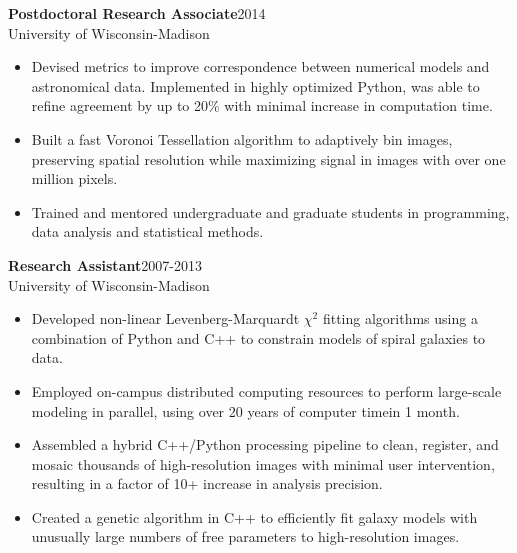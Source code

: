 \documentclass[11pt]{res}
\begin{document}
\begin{resume}
\pagebreak
{\bf Postdoctoral Research Associate}\hfill\mbox{2014}\\
University of Wisconsin-Madison
                  \vspace* {0.01 in}\begin{itemize} \itemsep -2pt
                    \item Devised metrics to improve correspondence between numerical models and
                      astronomical data. Implemented in highly
                      optimized Python, was able to refine agreement by
                      up to 20\% with minimal increase in computation time.
                    \item Built a fast Voronoi Tessellation algorithm
                      to adaptively bin images, preserving spatial
                      resolution while maximizing signal in images
                      with over one million pixels.
                    \item Trained and mentored undergraduate and
                      graduate students in programming, data analysis and statistical methods.
                    \end{itemize}

{\bf Research Assistant}\hfill\mbox{2007-2013}\\
University of Wisconsin-Madison
                  \vspace* {0.01 in}\begin{itemize} \itemsep -2pt
                    \item Developed non-linear Levenberg-Marquardt
                      $\chi^{2}$ fitting algorithms using a
                      combination of Python and C++ to constrain
                      models of spiral galaxies to data. 
                   \item Employed on-campus distributed computing
                     resources to perform large-scale modeling in parallel, using over 20 years of 
                     computer timein 1 month.
                   \item Assembled a hybrid C++/Python processing
                     pipeline to clean, register, and
                     mosaic thousands of high-resolution images with
                     minimal user intervention, resulting in a factor
                     of 10+ increase in analysis precision.
                   \item Created a genetic
                     algorithm in C++ to efficiently fit galaxy models with
                     unusually large numbers of
                     free parameters to high-resolution images.
                  \end{itemize} 


\end{resume}
\end{document}
